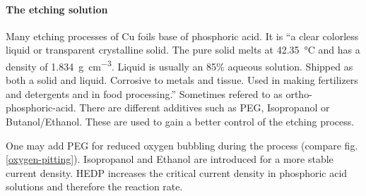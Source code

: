 % 
% 
% 
\paragraph{The etching solution} 

Many etching processes of Cu foils base of phosphoric acid. It is ``a clear colorless liquid or transparent crystalline solid. The pure solid melts at \SI{42.35}{\celsius} and has a density of \SI{1.834}{\g\per \cubic\cm}. Liquid is usually an 85\% aqueous solution. Shipped as both a solid and liquid. Corrosive to metals and tissue. Used in making fertilizers and detergents and in food processing.''\cite{_7664-38-2_2014} Sometimes refered to as ortho-phosphoric-acid. There are different additives such as PEG, Isopropanol or Butanol/Ethanol. These are used to gain a better control of the etching process. 

One may add PEG for reduced oxygen bubbling during the process (compare fig. \ref{oxygen-pitting})\cite{stables_report_2008,chang_superpolishing_2003}. Isopropanol and Ethanol are introduced for a more stable current density. HEDP increases the critical current density in phosphoric acid solutions\cite{jinshan_electrochemical_2004} and therefore the reaction rate.

